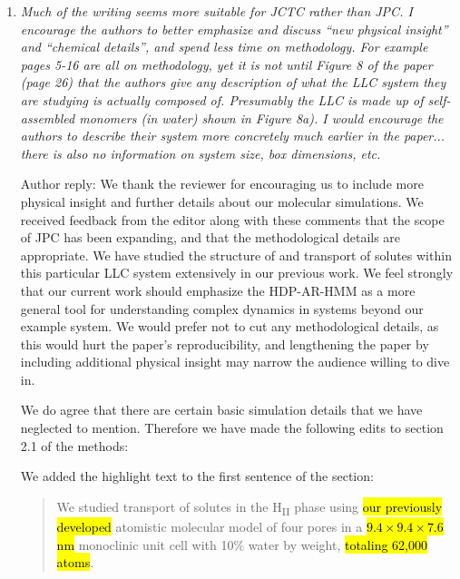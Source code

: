 \documentclass{article}
\begin{document}
\begin{enumerate}[label={Comment \theenumi :}, leftmargin=3.9\parindent]
    \item \textit{Much of the writing seems more suitable for JCTC rather than JPC. I encourage the
    authors to better emphasize and discuss “new physical insight” and “chemical details”, and spend
    less time on methodology. For example pages 5-16 are all on methodology, yet it is not until 
    Figure 8 of the paper (page 26) that the authors give any description of what the LLC system 
    they are studying is actually composed of. Presumably the LLC is made up of self-assembled 
    monomers (in water) shown in Figure 8a). I would encourage the authors to describe their 
    system more concretely much earlier in the paper... there is also no information on system 
    size, box dimensions, etc.}
    
    Author reply: We thank the reviewer for encouraging us to include
    more physical insight and further details about our molecular
    simulations. We received feedback from the editor along with these
    comments that the scope of JPC has been expanding, and that the
    methodological details are appropriate.
    We have studied the structure of and transport of solutes within this 
    particular LLC system extensively in our previous work.\cite{coscia_chemically_2019}
    We feel strongly that our current work should 
    emphasize the HDP-AR-HMM as a more general tool for understanding complex dynamics in 
    systems beyond our example system. We would prefer not to cut any methodological details, as
    this would hurt the paper's reproducibility, and lengthening the paper by including additional
    physical insight may narrow the audience willing to dive in.
    
    
    We do agree that there are certain basic simulation details that we have neglected to 
    mention. Therefore we have made the following edits to section 2.1 of the methods:
    
    We added the highlight text to the first sentence of the section:
    \begin{quote}
      We studied transport of solutes in the H\textsubscript{II} phase using \hl{our
      previously developed} atomistic molecular model of four pores in a 
      \hl{$9.4\times9.4\times7.6$ nm} monoclinic unit cell with 10\% water by weight, 
      \hl{totaling 62,000 atoms}.    
    \end{quote}
    

\end{enumerate}
\end{document}
